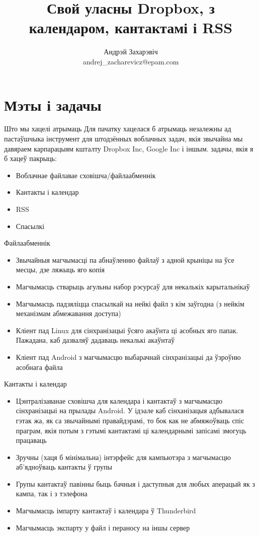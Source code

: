 \documentclass[ignorenonframetext,hyperref={pdftex,unicode}]{beamer}
\title{Свой уласны Dropbox, з календаром, кантактамі і RSS}
\author[Андрэй Захарэвіч]{Андрэй Захарэвіч\\ andrej\_zacharevicz@epam.com}
\begin{document}
\frame{\titlepage} 


\section{Мэты і задачы} 

\begin{frame}{Што мы хацелі атрымаць} 
	Для пачатку хацелася б атрымаць незалежны ад пастаўшчыка інструмент для штодзённых воблачных задач, якія звычайна мы давяраем карпарацыям кшталту Dropbox Inc, Google Inc і іншым.  задачы, якія я б хацеў пакрыць:
	\begin{itemize}
		\item Воблачнае файлавае сховішча/файлаабменнік
		\item Кантакты і календар
		\item RSS
		\item Спасылкі
	\end{itemize}
\end{frame}

\begin{frame}{Файлаабменнік}
	\begin{itemize}
		\item Звычайныя магчымасці па абнаўленню файлаў з адной крыніцы на ўсе месцы, дзе ляжыць яго копія
		\item Магчымасць стварыць агульны набор рэсурсаў для некалькіх карытальнікаў
		\item Магчымасць падзяліцца спасылкай на нейкі файл з кім заўгодна (з нейкім механізмам абмежавання доступа)
		\item Кліент пад Linux для сінхранізацыі ўсяго акаўнта ці асобных яго папак. Пажадана, каб дазваляў дадаваць некалькі акаўнтаў
		\item Кліент пад Android з магчымасцю выбарачнай сінхранізацыі да ўзроўню асобнага файла
	\end{itemize}
\end{frame}

\begin{frame}{Кантакты і календар}
	\begin{itemize}
		\item Цэнтралізаванае сховішча для календара і кантактаў з магчымасцю сінхранізацыі на прылады Android. У ідэале каб сінханізацыя адбывалася гэтак жа, як са звычайнымі правайдэрамі, то бок как не абмяжоўваць спіс праграм, якія потым з гэтымі кантактамі ці календарнымі запісамі змогуць працаваць
		\item Зручны (хаця б мінімальна) інтэрфейс для кампьютэра з магчымасцю аб’ядноўваць кантакты ў групы
		\item Групы кантактаў павінны быць бачныя і даступныя для любых аперацый як з кампа, так і з тэлефона
		\item Магчымасць імпарту кантактаў і календара ў Thunderbird
		\item Магчымасць экспарту у файл і пераносу на іншы сервер
	\end{itemize}
\end{frame}
\end{document}
